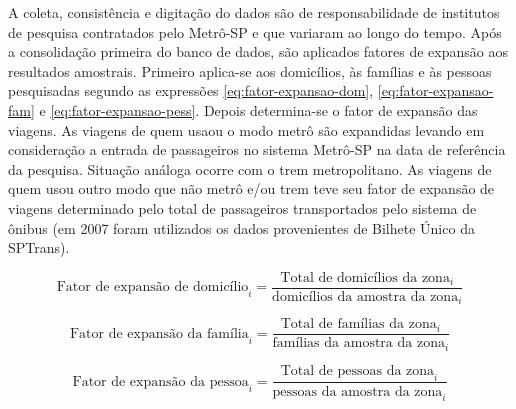 A coleta, consistência e digitação do dados são de responsabilidade de institutos de pesquisa contratados pelo Metrô-SP e que variaram ao longo do tempo. Após a consolidação primeira do banco de dados, são aplicados fatores de expansão aos resultados amostrais. Primeiro aplica-se aos domicílios, às famílias e às pessoas pesquisadas segundo as expressões \eqref{eq:fator-expansao-dom}, \eqref{eq:fator-expansao-fam} e \eqref{eq:fator-expansao-pess}. Depois determina-se o fator de expansão das viagens. As viagens de quem usaou o modo metrô são expandidas levando em consideração a entrada de passageiros no sistema Metrô-SP na data de referência da pesquisa. Situação análoga ocorre com o trem metropolitano. As viagens de quem usou outro modo que não metrô e/ou trem teve seu fator de expansão de viagens determinado pelo total de passageiros transportados pelo sistema de ônibus (em 2007 foram utilizados os dados provenientes de Bilhete Único da SPTrans).

\begin{equation}\label{eq:fator-expansao-dom}
\mbox{Fator de expansão de domicílio}_i = \frac{\mbox{Total de domicílios da zona}_i}{\mbox{domicílios da amostra da zona}_i}
\end{equation}


\begin{equation}\label{eq:fator-expansao-fam}
\mbox{Fator de expansão da família}_i = \frac{\mbox{Total de famílias da zona}_i}{\mbox{famílias da amostra da zona}_i}
\end{equation}

\begin{equation}\label{eq:fator-expansao-pess}
\mbox{Fator de expansão da pessoa}_i = \frac{\mbox{Total de pessoas da zona}_i}{\mbox{pessoas da amostra da zona}_i}
\end{equation}

